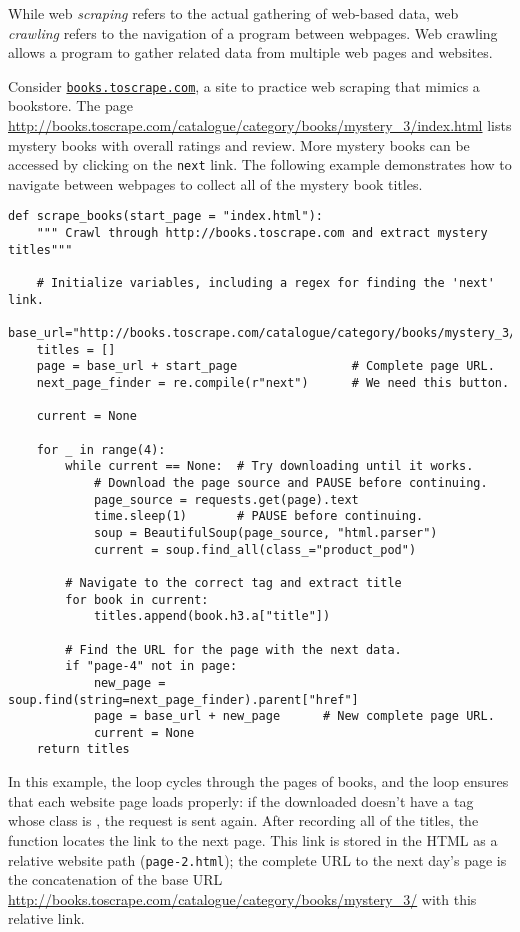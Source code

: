 While web \emph{scraping} refers to the actual gathering of web-based data, web \emph{crawling} refers to the navigation of a program between webpages.
Web crawling allows a program to gather related data from multiple web pages and websites.

Consider \href{http://books.toscrape.com}{\texttt{books.toscrape.com}}, a site to practice web scraping that mimics a bookstore.
The page \url{http://books.toscrape.com/catalogue/category/books/mystery_3/index.html} lists mystery books with overall ratings and review.
More mystery books can be accessed by clicking on the \texttt{next} link.
The following example demonstrates how to navigate between webpages to collect all of the mystery book titles.

\begin{lstlisting}
def scrape_books(start_page = "index.html"):
    """ Crawl through http://books.toscrape.com and extract mystery titles"""

    # Initialize variables, including a regex for finding the 'next' link.
    base_url="http://books.toscrape.com/catalogue/category/books/mystery_3/"
    titles = []
    page = base_url + start_page                # Complete page URL.
    next_page_finder = re.compile(r"next")      # We need this button.

    current = None

    for _ in range(4):
        while current == None:  # Try downloading until it works.
            # Download the page source and PAUSE before continuing.
            page_source = requests.get(page).text
            time.sleep(1)       # PAUSE before continuing.
            soup = BeautifulSoup(page_source, "html.parser")
            current = soup.find_all(class_="product_pod")

        # Navigate to the correct tag and extract title
        for book in current:
            titles.append(book.h3.a["title"])

        # Find the URL for the page with the next data.
        if "page-4" not in page:
            new_page = soup.find(string=next_page_finder).parent["href"]
            page = base_url + new_page      # New complete page URL.
            current = None
    return titles

\end{lstlisting}

In this example, the  loop cycles through the pages of books, and the  loop ensures that each website page loads properly: if the downloaded  doesn't have a tag whose class is , the request is sent again.
After recording all of the titles, the function locates the link to the next page.
This link is stored in the HTML as a relative website path (\texttt{page-2.html}); the complete URL to the next day's page is the concatenation of the base URL \url{http://books.toscrape.com/catalogue/category/books/mystery_3/} with this relative link.

